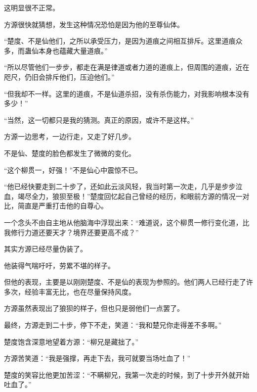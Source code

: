 \begin{this_body}
这明显很不正常。

方源很快就猜想，发生这种情况恐怕是因为他的至尊仙体。

“楚度、不是仙他们，之所以承受压力，是因为道痕之间相互排斥。这里道痕众多，而蛊仙本身也蕴藏大量道痕。”

“所以尽管他们一步步，都走在满是律道或者力道的道痕上，但周围的道痕，近在咫尺，仍旧会排斥他们，压迫他们。”

“但我却不一样。这里的道痕，不是仙道杀招，没有杀伤能力，对我影响根本没有多少！”

“当然，这一切都只是我的猜测。真正的原因，或许不是这样。”

方源一边思考，一边行走，又走了好几步。

不是仙、楚度的脸色都发生了微微的变化。

“这个柳贯一，好强！”不是仙心中震惊不已。

“他已经快要走到二十步了，还如此云淡风轻，我当时第一次走，几乎是步步泣血，竭尽全力，狼狈至极！”楚度回忆起自己曾经的经历，和眼前方源的情况一对比，简直是严重打击他的自尊心。

一个念头不由自主地从他脑海中浮现出来：“难道说，这个柳贯一修行变化道，比我修行力道还要天才？境界还要更高不成？”

其实方源已经尽量伪装了。

他装得气喘吁吁，劳累不堪的样子。

但他的表现，主要是以刚刚楚度、不是仙的表现为参照的。他们两人已经行走了许多次，经验丰富无比，也在尽量保持风度。

方源虽然表现出了狼狈的样子，但也只是弱他们一点罢了。

最终，方源走到二十步，停下不走，笑道：“我和楚兄你走得差不多啊。”

楚度饱含深意地望着方源：“柳兄是藏拙了。”

方源苦笑道：“我是强撑，再走下去，我可就要当场吐血了！”

楚度的笑容比他更加苦涩：“不瞒柳兄，我第一次走的时候，到了十步开外就开始吐血了。”

\end{this_body}

